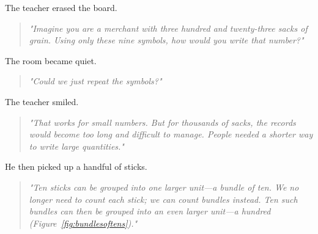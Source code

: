 \documentclass[11pt]{article}
\begin{document}
The teacher erased the board.
\begin{quote}
\emph{"Imagine you are a merchant with three hundred and twenty-three sacks of grain. Using only these nine symbols, how would you write that number?"}
\end{quote}
The room became quiet.
\begin{quote}
\emph{"Could we just repeat the symbols?"}
\end{quote}
The teacher smiled.
\begin{quote}
\emph{"That works for small numbers. But for thousands of sacks, the records would become too long and difficult to manage. People needed a shorter way to write large quantities."}
\end{quote}
He then picked up a handful of sticks.
\begin{quote}
\emph{"Ten sticks can be grouped into one larger unit—a bundle of ten. We no longer need to count each stick; we can count bundles instead. Ten such bundles can then be grouped into an even larger unit—a hundred (Figure~\ref{fig:bundlesoftens})."}
\end{quote}

\end{document}
